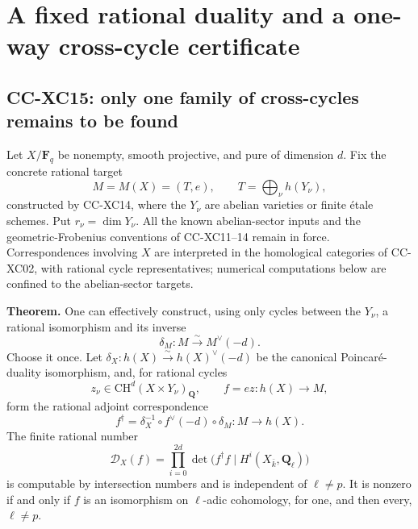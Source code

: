 \section{A fixed rational duality and a one-way cross-cycle
certificate}\label{a-fixed-rational-duality-and-a-one-way-cross-cycle-certificate}

\subsection{CC-XC15: only one family of cross-cycles remains to be
found}\label{cc-xc15-only-one-family-of-cross-cycles-remains-to-be-found}

Let \(X/\mathbf F_q\) be nonempty, smooth projective, and pure of
dimension \(d\). Fix the concrete rational target \[
       M=M(X)=(T,e),\qquad T=\bigoplus_\nu h(Y_\nu),
                                                        \tag{CC-XC.D1}
\] constructed by CC-XC14, where the \(Y_\nu\) are abelian varieties or
finite étale schemes. Put \(r_\nu=\dim Y_\nu\). All the known
abelian-sector inputs and the geometric-Frobenius conventions of
CC-XC11--14 remain in force. Correspondences involving \(X\) are
interpreted in the homological categories of CC-XC02, with rational
cycle representatives; numerical computations below are confined to the
abelian-sector targets.

\textbf{Theorem.} One can effectively construct, using only cycles
between the \(Y_\nu\), a rational isomorphism and its inverse \[
              \delta_M:M\xrightarrow{\sim}M^\vee(-d).
                                                        \tag{CC-XC.D2}
\] Choose it once. Let \(\delta_X:h(X)\xrightarrow{\sim}h(X)^\vee(-d)\)
be the canonical Poincaré-duality isomorphism, and, for rational cycles
\[
        z_\nu\in\mathrm{CH}^d(X\times Y_\nu)_{\mathbf Q},
        \qquad f=e z:h(X)\longrightarrow M,
                                                        \tag{CC-XC.D3}
\] form the rational adjoint correspondence \[
 f^\dagger=
   \delta_X^{-1}\circ f^\vee(-d)\circ\delta_M:
          M\longrightarrow h(X).                       \tag{CC-XC.D4}
\] The finite rational number \[
 \mathcal D_X(f)=
   \prod_{i=0}^{2d}
       \det\bigl(f^\dagger f\mid H^i(X_{\bar k},
                                             \mathbf Q_\ell)\bigr)
                                                        \tag{CC-XC.D5}
\] is computable by intersection numbers and is independent of
\(\ell\ne p\). It is nonzero if and only if \(f\) is an isomorphism on
\(\ell\)-adic cohomology, for one, and then every, \(\ell\ne p\).

